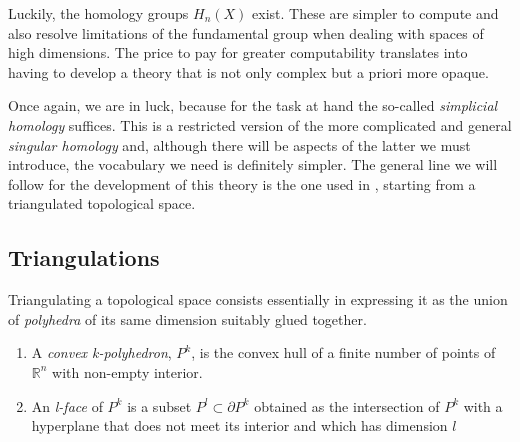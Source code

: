 Luckily, the homology groups $H_n(X)$ exist. These are simpler to compute and also resolve limitations of the fundamental group when dealing with spaces of high dimensions. The price to pay for greater computability translates into having to develop a theory that is not only complex but a priori more opaque.

Once again, we are in luck, because for the task at hand the so-called \textit{simplicial homology} suffices. This is a restricted version of the more complicated and general \textit{singular homology} and, although there will be aspects of the latter we must introduce, the vocabulary we need is definitely simpler. The general line we will follow for the development of this theory is the one used in \cite{munoz2021}, starting from a triangulated topological space.


\bigskip

\subsection{Triangulations}
\label{subsec:triangulaciones}

Triangulating a topological space consists essentially in expressing it as the union of \textit{polyhedra} of its same dimension suitably glued together.

\begin{definition} \hfill

    \begin{enumerate}[label=(\roman*)]
        \item  A \textit{convex k-polyhedron}, $P^k$, is the convex hull of a finite number of points of $\mathbb{R}^n$ with non-empty interior. %
        \item An \textit{l-face} of $P^k$ is a subset $P^l\subset \partial P^k$ obtained as the intersection of $P^k$ with a hyperplane that does not meet its interior and which has dimension $l$
    \end{enumerate}

\end{definition}

\bigskip

